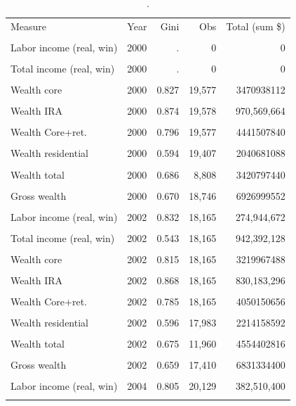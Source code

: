 \begin{table}[htbp]\centering
\caption{.}
\label{tab:gini_by_year}
\begin{tabular}{llrrr}\toprule
Measure & Year & Gini & Obs & Total (sum \$) \\\\ \midrule
Labor income (real, win) & 2000 & . & 0 & 0 \\\\
Total income (real, win) & 2000 & . & 0 & 0 \\\\
Wealth core & 2000 & 0.827 & 19,577 & 3470938112 \\\\
Wealth IRA & 2000 & 0.874 & 19,578 & 970,569,664 \\\\
Wealth Core+ret. & 2000 & 0.796 & 19,577 & 4441507840 \\\\
Wealth residential & 2000 & 0.594 & 19,407 & 2040681088 \\\\
Wealth total & 2000 & 0.686 & 8,808 & 3420797440 \\\\
Gross wealth & 2000 & 0.670 & 18,746 & 6926999552 \\\\
Labor income (real, win) & 2002 & 0.832 & 18,165 & 274,944,672 \\\\
Total income (real, win) & 2002 & 0.543 & 18,165 & 942,392,128 \\\\
Wealth core & 2002 & 0.815 & 18,165 & 3219967488 \\\\
Wealth IRA & 2002 & 0.868 & 18,165 & 830,183,296 \\\\
Wealth Core+ret. & 2002 & 0.785 & 18,165 & 4050150656 \\\\
Wealth residential & 2002 & 0.596 & 17,983 & 2214158592 \\\\
Wealth total & 2002 & 0.675 & 11,960 & 4554402816 \\\\
Gross wealth & 2002 & 0.659 & 17,410 & 6831334400 \\\\
Labor income (real, win) & 2004 & 0.805 & 20,129 & 382,510,400 \\\\

\end{tabular}
\end{table}
